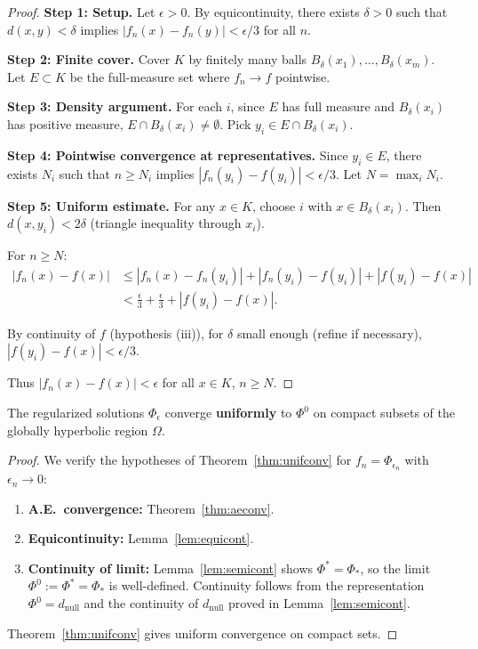 \begin{proof}
\textbf{Step 1: Setup.}
Let $\epsilon > 0$. By equicontinuity, there exists $\delta > 0$ such that $d(x, y) < \delta$ implies $|f_n(x) - f_n(y)| < \epsilon/3$ for all $n$.

\textbf{Step 2: Finite cover.}
Cover $K$ by finitely many balls $B_\delta(x_1), \ldots, B_\delta(x_m)$. Let $E \subset K$ be the full-measure set where $f_n \to f$ pointwise.

\textbf{Step 3: Density argument.}
For each $i$, since $E$ has full measure and $B_\delta(x_i)$ has positive measure, $E \cap B_\delta(x_i) \neq \emptyset$. Pick $y_i \in E \cap B_\delta(x_i)$.

\textbf{Step 4: Pointwise convergence at representatives.}
Since $y_i \in E$, there exists $N_i$ such that $n \geq N_i$ implies $|f_n(y_i) - f(y_i)| < \epsilon/3$. Let $N = \max_i N_i$.

\textbf{Step 5: Uniform estimate.}
For any $x \in K$, choose $i$ with $x \in B_\delta(x_i)$. Then $d(x, y_i) < 2\delta$ (triangle inequality through $x_i$).

For $n \geq N$:
\begin{align}
    |f_n(x) - f(x)| &\leq |f_n(x) - f_n(y_i)| + |f_n(y_i) - f(y_i)| + |f(y_i) - f(x)| \\
    &< \frac{\epsilon}{3} + \frac{\epsilon}{3} + |f(y_i) - f(x)|.
\end{align}

By continuity of $f$ (hypothesis (iii)), for $\delta$ small enough (refine if necessary), $|f(y_i) - f(x)| < \epsilon/3$.

Thus $|f_n(x) - f(x)| < \epsilon$ for all $x \in K$, $n \geq N$.
\end{proof}

\begin{corollary}\label{cor:uniflimit}
The regularized solutions $\Phi_\epsilon$ converge \textbf{uniformly} to $\Phi^0$ on compact subsets of the globally hyperbolic region $\Omega$.
\end{corollary}

\begin{proof}
We verify the hypotheses of Theorem~\ref{thm:unifconv} for $f_n = \Phi_{\epsilon_n}$ with $\epsilon_n \to 0$:
\begin{enumerate}
    \item[(i)] \textbf{A.E.\ convergence:} Theorem~\ref{thm:aeconv}.
    \item[(ii)] \textbf{Equicontinuity:} Lemma~\ref{lem:equicont}.
    \item[(iii)] \textbf{Continuity of limit:} Lemma~\ref{lem:semicont} shows $\Phi^* = \Phi_*$, so the limit $\Phi^0 := \Phi^* = \Phi_*$ is well-defined. Continuity follows from the representation $\Phi^0 = d_{\text{null}}$ and the continuity of $d_{\text{null}}$ proved in Lemma~\ref{lem:semicont}.
\end{enumerate}
Theorem~\ref{thm:unifconv} gives uniform convergence on compact sets.
\end{proof}

